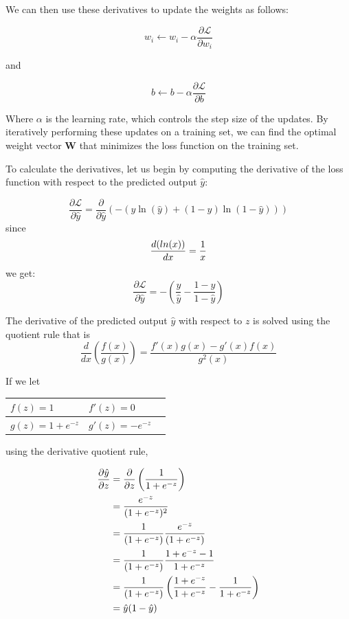 \documentclass[conference]{IEEEtran}
\begin{document}
	We can then use these derivatives to update the weights as follows:
	
	
	\begin{equation}
		w_i \leftarrow w_i - \alpha \frac{\partial \mathcal{L}}{\partial w_i}
	\end{equation}
	
	and
	
	\begin{equation}
		b \leftarrow b - \alpha \frac{\partial \mathcal{L}}{\partial b}
	\end{equation}
	
	
	Where $\alpha$ is the learning rate, which controls the step size of the updates. By iteratively performing these updates on a training set, we can find the optimal weight vector $\textbf{W}$ that minimizes the loss function on the training set.
	
	\bigskip
	
	To calculate the derivatives, let us begin by computing the derivative of the loss function with respect to the predicted output $\hat{y}$:
	
	
	$$
	\frac{\partial \mathcal{L}}{\partial\hat{y}} = 
	\frac{\partial}{\partial\hat{y}} 
	\left(  
	-\left(y\ln(\hat{y}) + (1-y)\ln(1-\hat{y})\right)
	\right) 
	$$
	since 
	$$\frac{d \space (ln (x))}{dx}  = \frac{1}{x}$$we get:
	$$\frac{\partial \mathcal{L}}{\partial \hat{y}} = - \left( \frac{y}{\hat{y}} - \frac{1-y}{1-\hat{y}} \right) $$
	
	The derivative of the predicted output $\hat{y}$ with respect to $z$ is solved using the quotient rule that is 
	$$
	\frac{d}{dx} \left( \frac{f(x)}{g(x)} \right) = \frac{f'(x)g(x) - g'(x)f(x)}{g^2(x)}
	$$
	
	If we let
	
	\begin{table}[!ht]
		\centering
		\begin{tabular}{|l|l|l|}
			\hline
			$f(z) = 1$ & $f'(z) = 0$ \\ \hline
			$g(z)=1 +e^{-z}$ & $g'(z)= -e^{-z}$ \\ \hline
			\end{tabular}
	\end{table}

	using the derivative quotient rule,
	
	\begin{align*}
		\frac{\partial\hat{y}}{\partial z} 
		& = \frac{\partial}{\partial z} \left( \frac{1}{1 + e^{-z}} \right) \\
		& = \frac{e^{-z}}{(1 + e^{-z})^2} \\
		& = \frac{1}{(1 + e^{-z})} \space \frac{e^{-z}}{(1 + e^{-z})} \\
		& = \frac{1}{(1 + e^{-z})} \space \frac{1 + e^{-z} -1}{1 + e^{-z}} \\
		& = \frac{1}{(1 + e^{-z})} \space \left( \frac{1 + e^{-z}}{1 + e^{-z}} - \frac{1}{1 + e^{-z}} \right)\\
		& = \hat{y}(1-\hat{y})\\
	\end{align*}
	
\end{document}
